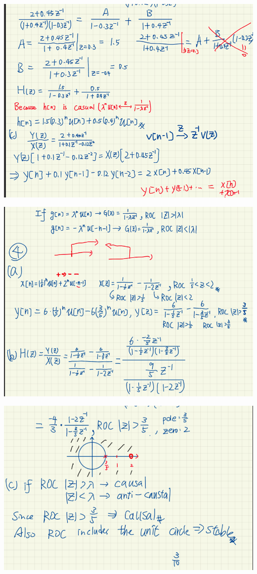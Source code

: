 \documentclass[a4paper]{article}
\begin{document}
	
	
	\begin{center}
		\includegraphics[width=1\linewidth]{screenshot046}
	\end{center}
	
	
	\begin{center}
		\includegraphics[width=1\linewidth]{screenshot047}
	\end{center}
	\begin{center}
		\includegraphics[width=1\linewidth]{screenshot048}
	\end{center}
	
\end{document}
